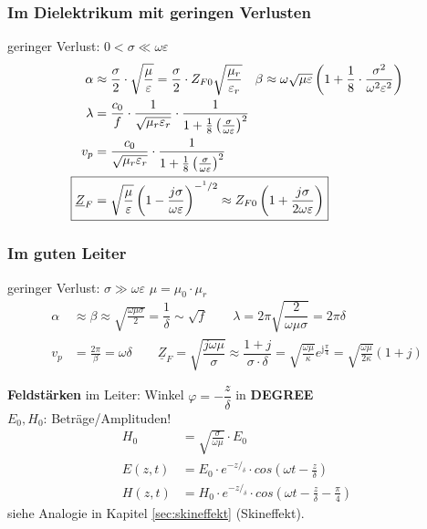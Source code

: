 \subsubsection{Im Dielektrikum mit geringen Verlusten}
geringer Verlust: $0 < \sigma \ll\omega\varepsilon$
\begin{align*}
    \alpha                  & \approx\dfrac{\sigma}{2}\cdot\sqrt{\dfrac{\mu}{\varepsilon}} = \frac{\sigma}{2}\cdot Z_{F0}\sqrt{\frac{\mu_r}{\varepsilon_r}}  \quad 
    \beta \approx\omega\sqrt{\mu\varepsilon}\left(1+\dfrac{1}{8}\cdot\dfrac{\sigma^2}{\omega^2\varepsilon^2}\right)                                                  \\
    \lambda                 & = \dfrac{c_0}{f}\cdot\dfrac{1}{\sqrt{\mu_r\varepsilon_r}}\cdot\frac{1}{1+\frac{1}{8}\left(\frac{\sigma}{\omega\varepsilon}\right)^2}                       \\
    v_p                     & = \dfrac{c_0}{\sqrt{\mu_r\varepsilon_r}}\cdot\frac{1}{1+\frac{1}{8}\left(\frac{\sigma}{\omega\varepsilon}\right)^2}                                        \\
    \Aboxed{\underline{Z}_F & = \sqrt{\dfrac{\mu}{\varepsilon}}\left(1-\frac{j\sigma}{\omega\varepsilon}\right)^{-^1/2} \approx Z_{F0}\left(1+\frac{j\sigma}{2\omega\varepsilon}\right)}
\end{align*}

\subsubsection{Im guten Leiter}\label{sec:Ausbreitug_guter_Leiter}
geringer Verlust: $\sigma \gg\omega\varepsilon$ \quad $\mu = \mu_0 \cdot \mu_r$
\begin{align*}
    \alpha                  & \approx \beta \approx\sqrt{\frac{\omega\mu\sigma}{2}}=\dfrac{1}{\delta}\sim\sqrt{f} \qquad
    \lambda                 = 2\pi \sqrt{\dfrac{2}{\omega\mu\sigma}}=2\pi\delta                                 \\
    v_p                     & = \frac{2\pi}{\beta} = \omega\delta        \qquad                                        
    \boxed{\underline{Z}_F = \sqrt{\dfrac{j\omega\mu}{\sigma}} \approx \dfrac{1+j}{\sigma\cdot\delta} = \sqrt{\frac{\omega \mu}{\kappa}}e^{\mathrm{j}\frac{\pi}{4}} = \sqrt{\frac{\omega \mu}{2 \kappa}}(1+j)   }
\end{align*}

\textbf{Feldstärken} im Leiter: \qquad Winkel $\varphi = - \dfrac{z}{\delta}$ in \textbf{DEGREE}\\
$E_0, H_0$: Beträge/Amplituden!
\begin{align*}
	H_0 &= \sqrt{\frac{\sigma}{\omega \mu}}\cdot E_0\\
	E(z,t) &= E_0 \cdot e^{- z/_\delta}\cdot cos(\omega t-\frac{z}{\delta})\\
	H(z,t) &= H_0 \cdot e^{- z/_\delta}\cdot cos(\omega t- \frac{z}{\delta}-\frac{\pi}{4})
\end{align*}
siehe Analogie in Kapitel \ref{sec:skineffekt} (Skineffekt).
